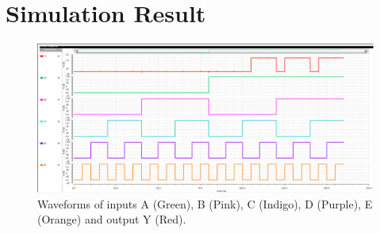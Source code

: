 \documentclass[11pt]{article}
\begin{document}
\section{Simulation Result}
\begin{figure}[!h]
    \centering
    \includegraphics[width=\textwidth]{plot.png}
    \caption{Waveforms of inputs A (Green), B (Pink), C (Indigo), D (Purple), E (Orange) and output Y (Red).}
\end{figure}
\end{document}

